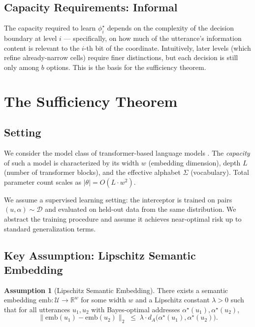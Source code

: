 \documentclass[11pt,twocolumn,a4paper]{article}
\theoremstyle{definition}
\newtheorem{assumption}[theorem]{Assumption}
\theoremstyle{remark}
\newcommand{\R}{\mathbb{R}}
\newcommand{\Uc}{\mathcal{U}}
\begin{document}
\subsection{Capacity Requirements: Informal}

The capacity required to learn $\phi_i^\star$ depends on the complexity of the decision boundary at level $i$ --- specifically, on how much of the utterance's information content is relevant to the $i$-th bit of the coordinate. Intuitively, later levels (which refine already-narrow cells) require finer distinctions, but each decision is still only among $b$ options. This is the basis for the sufficiency theorem.

\section{The Sufficiency Theorem}
\label{sec:sufficiency}

\subsection{Setting}

We consider the model class of transformer-based language models \citep{vaswani2017attention}. The \emph{capacity} of such a model is characterized by its width $w$ (embedding dimension), depth $L$ (number of transformer blocks), and the effective alphabet $\Sigma$ (vocabulary). Total parameter count scales as $|\theta| = O(L \cdot w^2)$.

We assume a supervised learning setting: the interceptor is trained on pairs $(u, \alpha) \sim \mathcal{D}$ and evaluated on held-out data from the same distribution. We abstract the training procedure and assume it achieves near-optimal risk up to standard generalization terms.

\subsection{Key Assumption: Lipschitz Semantic Embedding}

\begin{assumption}[Lipschitz Semantic Embedding]
\label{assum:lipschitz}
There exists a semantic embedding $\mathrm{emb}: \Uc \to \R^w$ for some width $w$ and a Lipschitz constant $\lambda > 0$ such that for all utterances $u_1, u_2$ with Bayes-optimal addresses $\alpha^\star(u_1), \alpha^\star(u_2)$,
\[
\|\mathrm{emb}(u_1) - \mathrm{emb}(u_2)\|_2 \;\leq\; \lambda \cdot d_A\bigl(\alpha^\star(u_1), \alpha^\star(u_2)\bigr).
\]
\end{assumption}
\end{document}
